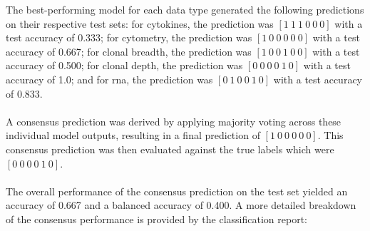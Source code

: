 \documentclass[12pt,a4paper]{report}
\begin{document}
\noindent
The best-performing model for each data type generated the following predictions on their respective test sets: for cytokines, the prediction was $[1\ 1\ 1\ 0\ 0\ 0]$ with a test accuracy of 0.333; for cytometry, the prediction was $[1\ 0\ 0\ 0\ 0\ 0]$ with a test accuracy of 0.667; for clonal breadth, the prediction was $[1\ 0\ 0\ 1\ 0\ 0]$ with a test accuracy of 0.500; for clonal depth, the prediction was $[0\ 0\ 0\ 0\ 1\ 0]$ with a test accuracy of 1.0; and for \acrshort{rna}, the prediction was $[0\ 1\ 0\ 0\ 1\ 0]$ with a test accuracy of 0.833.\\
\\
A consensus prediction was derived by applying majority voting across these individual model outputs, resulting in a final prediction of $[1\ 0\ 0\ 0\ 0\ 0]$. This consensus prediction was then evaluated against the true labels which were $[0\ 0\ 0\ 0\ 1\ 0]$.\\
\\
The overall performance of the consensus prediction on the test set yielded an accuracy of 0.667 and a balanced accuracy of 0.400. A more detailed breakdown of the consensus performance is provided by the classification report:
\begin{table}[h!]
    \centering
    \caption[Consensus Classification Report Uncompressed Features]{Consensus Classification Report for Uncompressed Features}
    \label{tab:consensus_report_uncompressed}
\end{table}
\end{document}
